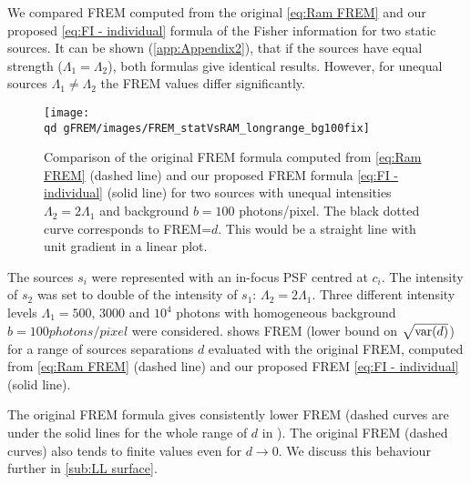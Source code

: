 We compared FREM computed from the original \autoref{eq:Ram FREM} and our proposed \autoref{eq:FI - individual} formula of the Fisher information for two static sources. It can be shown (\autoref{app:Appendix2}), that if the sources have equal strength ($\Lambda_1=\Lambda_2$), both formulas give identical results. However, for unequal sources $\Lambda_1\neq\Lambda_2$ the 
FREM values differ significantly. 
%
\begin{figure}[!bt]
	\centering
	\newcommand{\wf}{.49\textwidth}
	\texttt{[image: \\qd gFREM/images/FREM\_statVsRAM\_longrange\_bg100fix]}
	\caption{Comparison of the original FREM formula computed from \autoref{eq:Ram FREM} (dashed line) and our proposed FREM formula \autoref{eq:FI - individual} (solid line) for two sources with unequal intensities $\Lambda_2=2\Lambda_1$ and background $b=100$ photons/pixel. The black dotted curve corresponds to FREM=$d$. This would be a straight line with unit gradient in a linear plot. } 
	\label{fig:Comparison FREM Ram and fix}
\end{figure}

The sources $s_i$ were represented with an in-focus PSF centred at $c_i$. The intensity of $s_2$ was set to double of the intensity of $s_1$: $\Lambda_2=2\Lambda_1$. Three different intensity levels $\Lambda_1=500,\,3000$ and $10^4$ photons with homogeneous background $b=100\unit{photons/pixel}$ were considered.  shows FREM (lower bound on $\sqrt{\mathrm{var}(d)}$) for a range of sources separations $d$ evaluated with the original FREM, computed from \autoref{eq:Ram FREM} (dashed line) and our proposed FREM \autoref{eq:FI - individual} (solid line).

The original FREM formula gives consistently lower FREM (dashed curves are under the solid lines for the whole range of $d$ in ). The original FREM (dashed curves) also tends to finite values even for $d\rightarrow 0$. We discuss this behaviour further in \autoref{sub:LL surface}. 

